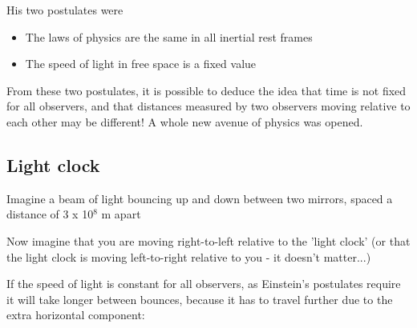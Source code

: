\documentclass[revision-guide.tex]{subfiles}
\begin{document}



His two postulates were 
\begin{itemize}
	\item The laws of physics are the same in all inertial rest frames
	\item The speed of light in free space is a fixed value
\end{itemize}

From these two postulates, it is possible to deduce the idea that time is not fixed for all observers, and that distances measured by two observers moving relative to each other may be different! A whole new avenue of physics was opened.


\subsection{Light clock}

Imagine a beam of light bouncing up and down between two mirrors, spaced a distance of 3 x 10$^8$ m apart

\begin{figure}[h]
	\begin{center}
		
		
		\end{center}
\end{figure}

Now imagine that you are moving right-to-left relative to the 'light clock' (or that the light clock is moving left-to-right relative to you - it doesn't matter...)


If the speed of light is constant for all observers, as Einstein's postulates require it will take longer between bounces, because it has to travel further due to the extra horizontal component:
\end{document}
